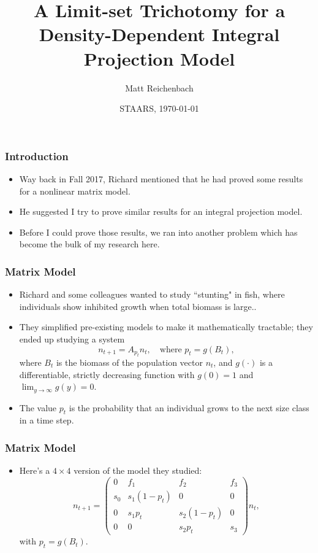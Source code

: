 \documentclass{beamer}
\title[Density Dependent Growth]{A Limit-set Trichotomy for a Density-Dependent Integral Projection Model}
\author[Matt Reichenbach]{Matt Reichenbach}
\date[\today]{STAARS, \today}
\begin{document}
\frame{\titlepage}


\begin{frame}
\frametitle{Introduction}
	\begin{itemize}
		\pause
		\item Way back in Fall 2017, Richard mentioned that he had proved some results for a nonlinear matrix model.
		\pause
		\item He suggested I try to prove similar results for an integral projection model.
		\pause
		\item Before I could prove those results, we ran into another problem which has become the bulk of my research here.
	\end{itemize}
\end{frame}

\begin{frame}
	\frametitle{Matrix Model}
	\begin{itemize}
		\pause
		\item Richard and some colleagues wanted to study ``stunting" in fish, where individuals show inhibited growth when total biomass is large..
		\pause
		\item They simplified pre-existing models to make it mathematically tractable; they ended up studying a system
		\[n_{t+1} = A_{p_t} n_t, \quad \text{where } p_t = g(B_t),\]
		\pause
		where $B_t$ is the biomass of the population vector $n_t$, and $g(\cdot)$ is a differentiable, strictly decreasing function with $g(0)=1$ and $\lim_{y \to \infty} g(y) = 0$.
		\pause
		\item The value $p_t$ is the probability that an individual grows to the next size class in a time step.
	\end{itemize}
\end{frame}

\begin{frame}
	\frametitle{Matrix Model}
	\begin{itemize}
		\pause
		\item Here's a $4 \times 4$ version of the model they studied:
		\[n_{t + 1} = \begin{pmatrix} 0 & f_1 & f_2 & f_3 \\ s_0 & s_1(1 - p_t) & 0 & 0 \\ 0 & s_1 p_t & s_2 (1 - p_t) & 0 \\ 0 & 0 & s_2 p_t & s_3 \end{pmatrix} n_t,\]
		\pause
		with $p_t = g(B_t)$.
	\end{itemize}
\end{frame}
\end{document}
